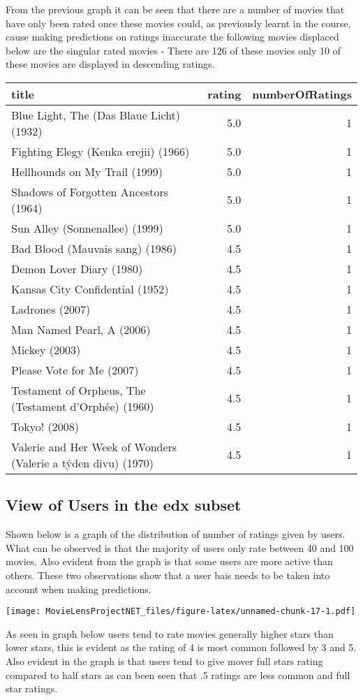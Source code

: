 \documentclass[
]{article}
\begin{document}
From the previous graph it can be seen that there are a number of movies
that have only been rated once these movies could, as previously learnt
in the course, cause making predictions on ratings inaccurate the
following movies displaced below are the singular rated movies - There
are 126 of these movies only 10 of these movies are displayed in
descending ratings.

\begin{longtable}[]{@{}lrr@{}}
\toprule
title & rating & numberOfRatings\tabularnewline
\midrule
\endhead
Blue Light, The (Das Blaue Licht) (1932) & 5.0 & 1\tabularnewline
Fighting Elegy (Kenka erejii) (1966) & 5.0 & 1\tabularnewline
Hellhounds on My Trail (1999) & 5.0 & 1\tabularnewline
Shadows of Forgotten Ancestors (1964) & 5.0 & 1\tabularnewline
Sun Alley (Sonnenallee) (1999) & 5.0 & 1\tabularnewline
Bad Blood (Mauvais sang) (1986) & 4.5 & 1\tabularnewline
Demon Lover Diary (1980) & 4.5 & 1\tabularnewline
Kansas City Confidential (1952) & 4.5 & 1\tabularnewline
Ladrones (2007) & 4.5 & 1\tabularnewline
Man Named Pearl, A (2006) & 4.5 & 1\tabularnewline
Mickey (2003) & 4.5 & 1\tabularnewline
Please Vote for Me (2007) & 4.5 & 1\tabularnewline
Testament of Orpheus, The (Testament d'Orphée) (1960) & 4.5 &
1\tabularnewline
Tokyo! (2008) & 4.5 & 1\tabularnewline
Valerie and Her Week of Wonders (Valerie a týden divu) (1970) & 4.5 &
1\tabularnewline
\bottomrule
\end{longtable}

\hypertarget{view-of-users-in-the-edx-subset}{%
\subsection{View of Users in the edx
subset}\label{view-of-users-in-the-edx-subset}}

Shown below is a graph of the distribution of number of ratings given by
users. What can be observed is that the majority of users only rate
between 40 and 100 movies. Also evident from the graph is that some
users are more active than others. These two observations show that a
user bais needs to be taken into account when making predictions.

\texttt{[image: MovieLensProjectNET\_files/figure-latex/unnamed-chunk-17-1.pdf]}

As seen in graph below users tend to rate movies generally higher stars
than lower stars, this is evident as the rating of 4 is most common
followed by 3 and 5. Also evident in the graph is that users tend to
give mover full stars rating compared to half stars as can been seen
that .5 ratings are less common and full star ratings.
\end{document}
